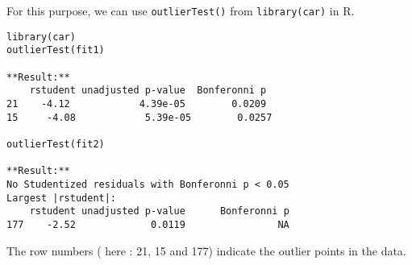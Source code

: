 For this purpose, we can use \texttt{outlierTest()} from \texttt{library(car)} in R. 




\begin{verbatim}
library(car)
outlierTest(fit1)   

**Result:**
    rstudent unadjusted p-value  Bonferonni p
21    -4.12            4.39e-05        0.0209
15     -4.08            5.39e-05        0.0257

outlierTest(fit2)   

**Result:**
No Studentized residuals with Bonferonni p < 0.05
Largest |rstudent|:
    rstudent unadjusted p-value      Bonferonni p
177    -2.52             0.0119                NA
\end{verbatim}


The row numbers ( here : 21, 15 and 177) indicate the outlier points in the data.




